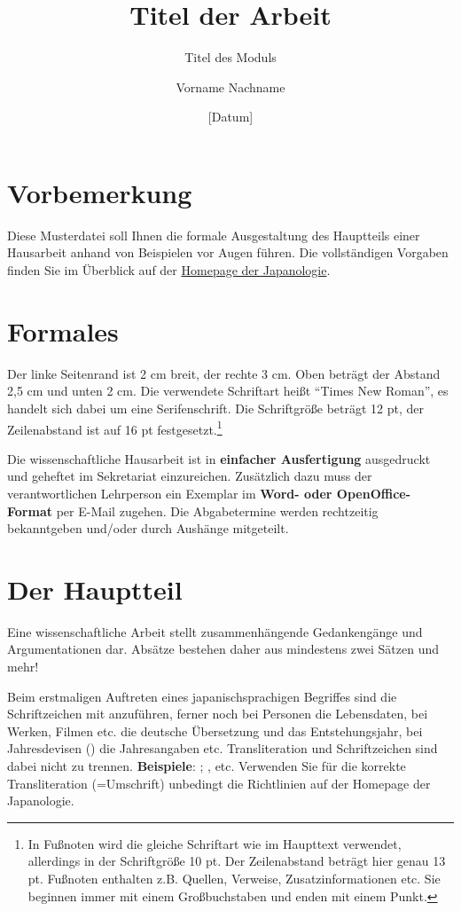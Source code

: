 \documentclass{japuzk}
\title{Titel der Arbeit}
\subtitle{Titel des Moduls}
\date{[Datum]}
\author{Vorname Nachname}
\begin{document}
\maketitle
\tableofcontents

\section{Vorbemerkung}
Diese Musterdatei soll Ihnen die formale Ausgestaltung des Hauptteils einer Hausarbeit anhand von Beispielen vor Augen führen. Die vollständigen Vorgaben finden Sie im Überblick auf der \href{\japfacultyhomepage}{Homepage der Japanologie}.

\section{Formales}
Der linke Seitenrand ist 2 cm breit, der rechte 3 cm. Oben beträgt der Abstand 2,5 cm und unten 2 cm. Die verwendete Schriftart heißt \enquote{Times New Roman}, es handelt sich dabei um eine Serifenschrift. Die Schriftgröße beträgt 12 pt, der Zeilenabstand ist auf 16 pt festgesetzt.\footnote{In Fußnoten wird die gleiche Schriftart wie im Haupttext verwendet, allerdings in der Schriftgröße 10 pt. Der Zeilenabstand beträgt hier genau 13 pt. Fußnoten enthalten z.B. Quellen, Verweise, Zusatzinformationen etc. Sie beginnen immer mit einem Großbuchstaben und enden mit einem Punkt.}

Die wissenschaftliche Hausarbeit ist in \textbf{einfacher Ausfertigung} ausgedruckt und geheftet im Sekretariat einzureichen. Zusätzlich dazu muss der verantwortlichen Lehrperson ein Exemplar im \textbf{Word- oder OpenOffice-Format} per E-Mail zugehen. Die Abgabetermine werden rechtzeitig bekanntgeben und/oder durch Aushänge mitgeteilt.

\section{Der Hauptteil}
Eine wissenschaftliche Arbeit stellt zusammenhängende Gedankengänge und Argumentationen dar. Absätze bestehen daher aus mindestens zwei Sätzen und mehr!

Beim erstmaligen Auftreten eines japanischsprachigen Begriffes sind die Schriftzeichen mit anzuführen, ferner noch bei Personen die Lebensdaten, bei Werken, Filmen etc. die deutsche Übersetzung und das Entstehungsjahr, bei Jahresdevisen () die Jahresangaben etc. Transliteration und Schriftzeichen sind dabei nicht zu trennen.\newline
\textbf{Beispiele}: ; ,  etc.\newline
Verwenden Sie für die korrekte Transliteration (=Umschrift) unbedingt die Richtlinien auf der Homepage der Japanologie.
\end{document}
